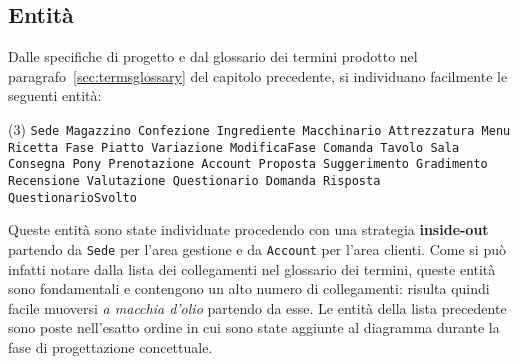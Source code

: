 \subsection{Entità}
Dalle specifiche di progetto e dal glossario dei termini prodotto nel
paragrafo~\vref{sec:termsglossary} del capitolo precedente, si individuano facilmente
le seguenti entità:
\begin{tasks}[label=\textbullet](3)
    \task\tt Sede
    \task\tt Magazzino
    \task\tt Confezione
    \task\tt Ingrediente
    \task\tt Macchinario
    \task\tt Attrezzatura
    \task\tt Menu
    \task\tt Ricetta
    \task\tt Fase
    \task\tt Piatto
    \task\tt Variazione
    \task\tt ModificaFase\footnotemark
    \task\tt Comanda
    \task\tt Tavolo
    \task\tt Sala
    \task\tt Consegna
    \task\tt Pony
    \task\tt Prenotazione
    \task\tt Account
    \task\tt Proposta
    \task\tt Suggerimento
    \task\tt Gradimento
    \task\tt Recensione
    \task\tt Valutazione
    \task\tt Questionario
    \task\tt Domanda
    \task\tt Risposta
    \task\tt QuestionarioSvolto
\end{tasks}
Queste entità sono state individuate procedendo con una strategia {\bf inside-out}
partendo da {\tt Sede} per l'area gestione e da {\tt Account} per l'area clienti. Come
si può infatti notare dalla lista dei collegamenti nel glossario dei termini, queste
entità sono fondamentali e contengono un alto numero di collegamenti: risulta quindi
facile muoversi {\it a macchia d'olio} partendo da esse.
Le entità della lista precedente sono poste nell'esatto ordine in cui sono state
aggiunte al diagramma durante la fase di progettazione concettuale.
